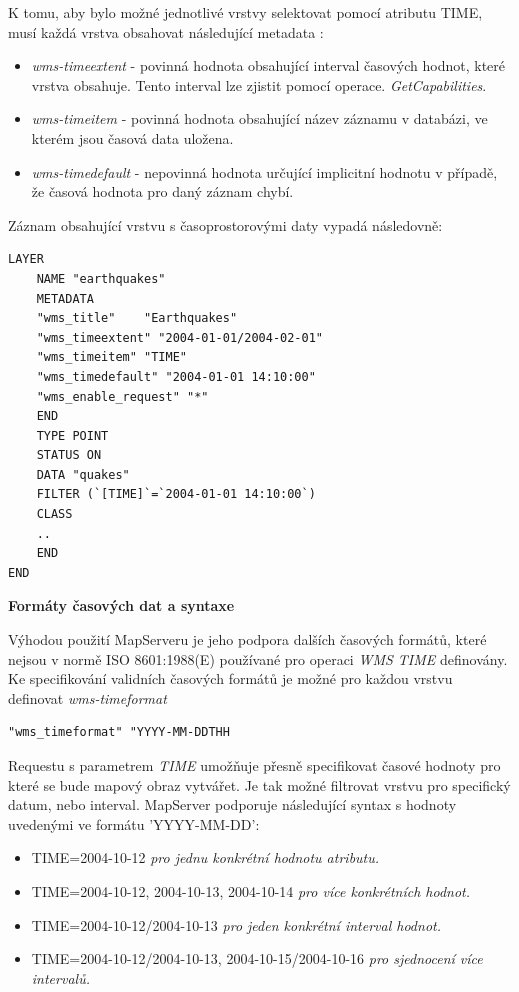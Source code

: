 K tomu, aby bylo možné jednotlivé vrstvy selektovat pomocí atributu
TIME, musí každá vrstva obsahovat následující metadata
\cite{mapserver_about}:

\begin{itemize}
\item\textit{wms-timeextent} - povinná hodnota obsahující interval
  časových hodnot, které vrstva obsahuje. Tento interval lze zjistit
  pomocí operace. \textit{GetCapabilities}.
\item\textit{wms-timeitem} - povinná hodnota obsahující název záznamu
  v databázi, ve kterém jsou časová data uložena.
\item\textit{wms-timedefault} - nepovinná hodnota určující implicitní
  hodnotu v případě, že časová hodnota pro daný záznam chybí.
\end{itemize}

\noindent
Záznam obsahující vrstvu s časoprostorovými daty vypadá následovně:

\begin{verbatim}
LAYER
	NAME "earthquakes"
	METADATA
	"wms_title"    "Earthquakes"
	"wms_timeextent" "2004-01-01/2004-02-01"
	"wms_timeitem" "TIME"
	"wms_timedefault" "2004-01-01 14:10:00"
	"wms_enable_request" "*"
	END
	TYPE POINT
	STATUS ON
	DATA "quakes"
	FILTER (`[TIME]`=`2004-01-01 14:10:00`)
	CLASS
	..
	END
END
\end{verbatim}

\bigskip
\noindent
\textbf{Formáty časových dat a syntaxe}

Výhodou použití MapServeru je jeho podpora dalších časových formátů,
které nejsou v normě ISO 8601:1988(E) používané pro operaci
\textit{WMS TIME} definovány. Ke specifikování validních časových
formátů je možné pro každou vrstvu definovat \textit{wms-timeformat}

\begin{verbatim}
"wms_timeformat" "YYYY-MM-DDTHH
\end{verbatim}

Requestu s parametrem \textit{TIME} umožňuje přesně specifikovat
časové hodnoty pro které se bude mapový obraz vytvářet. Je tak možné
filtrovat vrstvu pro specifický datum, nebo interval. MapServer
podporuje následující syntax s hodnoty uvedenými ve formátu
'YYYY-MM-DD':

\begin{itemize}
\item TIME=2004-10-12 \textit{pro jednu konkrétní hodnotu atributu.}
\item TIME=2004-10-12, 2004-10-13, 2004-10-14 \textit{pro více
    konkrétních hodnot.}
\item TIME=2004-10-12/2004-10-13 \textit{pro jeden konkrétní interval
    hodnot.}
\item TIME=2004-10-12/2004-10-13, 2004-10-15/2004-10-16 \textit{pro
    sjednocení více intervalů.}
\end{itemize}

